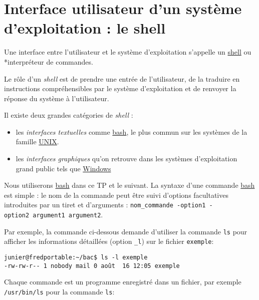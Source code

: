 \documentclass[
  11pt,
]{article}
\providecommand{\tightlist}{%
  \setlength{\itemsep}{0pt}\setlength{\parskip}{0pt}}
\newcounter{prog}
\begin{document}
\hypertarget{interface-utilisateur-dun-systuxe8me-dexploitation-le-shell}{%
\section{Interface utilisateur d'un système d'exploitation : le
shell}\label{interface-utilisateur-dun-systuxe8me-dexploitation-le-shell}}

Une interface entre l'utilisateur et le système d'exploitation s'appelle
un \href{https://fr.wikipedia.org/wiki/Shell_Unix}{shell} ou
*interpréteur de commandes.

Le rôle d'un \emph{shell} est de prendre une entrée de l'utilisateur, de
la traduire en instructions compréhensibles par le système
d'exploitation et de renvoyer la réponse du système à l'utilisateur.

Il existe deux grandes catégories de \emph{shell} :

\begin{itemize}
\tightlist
\item
  les \emph{interfaces textuelles} comme
  \href{https://fr.wikipedia.org/wiki/Bourne-Again_shell}{bash}, le plus
  commun sur les systèmes de la famille
  \href{https://fr.wikipedia.org/wiki/Bourne-Again_shell}{UNIX}.
\item
  les \emph{interfaces graphiques} qu'on retrouve dans les systèmes
  d'exploitation grand public tels que
  \href{https://fr.wikipedia.org/wiki/Microsoft_Windows}{Windows}
\end{itemize}

Nous utiliserons
\href{https://fr.wikipedia.org/wiki/Bourne-Again_shell}{bash} dans ce TP
et le suivant. La syntaxe d'une commande
\href{https://fr.wikipedia.org/wiki/Bourne-Again_shell}{bash} est simple
: le nom de la commande peut être suivi d'options facultatives
introduites par un tiret et d'arguments :
\texttt{nom\_commande\ -option1\ -option2\ argument1\ argument2}.

Par exemple, la commande ci-dessous demande d'utiliser la commande
\texttt{ls} pour afficher les informations détaillées (option
\texttt{\_l}) sur le fichier \texttt{exemple}:

\begin{verbatim}
junier@fredportable:~/bac$ ls -l exemple
-rw-rw-r-- 1 nobody mail 0 août  16 12:05 exemple
\end{verbatim}

Chaque commande est un programme enregistré dans un fichier, par exemple
\texttt{/usr/bin/ls} pour la commande \texttt{ls}:
\end{document}
